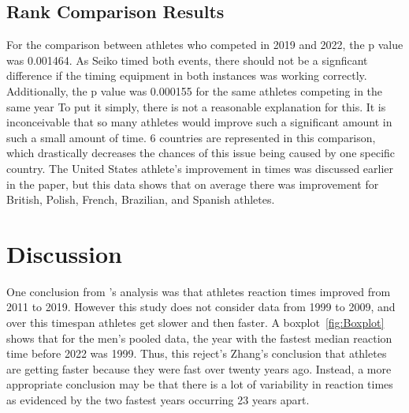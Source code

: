 \documentclass[12pt, letterpaper, titlepage]{article}
\begin{document}
\subsection{Rank Comparison Results}


For the comparison between athletes who competed in 2019 and 2022, the p value
was 0.001464.  As Seiko timed both events, there should not be a signficant
difference if the timing equipment in both instances was working correctly.
Additionally, the p value was 0.000155 for the same athletes competing in the 
same year  To put it simply, there is not a reasonable explanation for 
this. It is inconceivable that so many athletes would improve such a significant
amount in such a small amount of time. 6 countries are represented in this 
comparison, which drastically decreases the chances of this issue being caused by
one specific country.  The United States athlete's improvement in times was
discussed earlier in the paper, but this data shows that on average there was
improvement for British, Polish, French, Brazilian, and Spanish athletes.


\section{Discussion}\label{sec:Discussion}

One conclusion from \citet{zhang2021correlation}'s analysis was that athletes
reaction times improved from 2011 to 2019.  However this study does not consider 
data from 1999 to 2009, and over this timespan athletes get slower and then
faster.  A boxplot~\ref{fig:Boxplot} shows that for the men's pooled data, the 
year with the fastest median reaction time before 2022 was 1999.  Thus, this 
reject's Zhang's conclusion that athletes are getting faster because they were 
fast over twenty years ago.  Instead, a more appropriate conclusion may be that
there is a lot of variability in reaction times as evidenced by the two fastest
years occurring 23 years apart.
\end{document}
